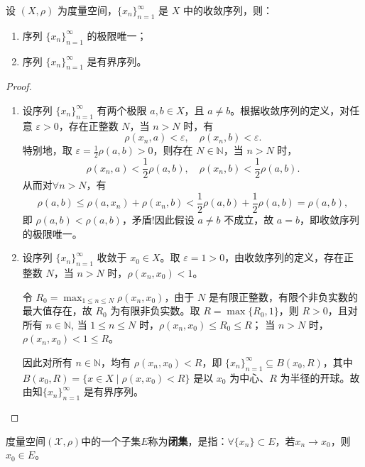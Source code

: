 \documentclass[../../main.tex]{subfiles}%
\begin{document}
\begin{theorem}\label{theorem:度量空间中收敛序列极限的唯一性和序列有界性}
设 $(X,\rho)$ 为度量空间，$\{x_n\}_{n=1}^\infty$ 是 $X$ 中的收敛序列，则：
\begin{enumerate}[(1)]
\item 序列 $\{x_n\}_{n=1}^\infty$ 的极限唯一；

\item 序列 $\{x_n\}_{n=1}^\infty$ 是有界序列。
\end{enumerate}
\end{theorem}
\begin{proof}
\begin{enumerate}[(1)]
\item 设序列 $\{x_n\}_{n=1}^\infty$ 有两个极限 $a,b \in X$，且 $a \neq b$。根据收敛序列的定义，对任意 $\varepsilon > 0$，存在正整数 $N$，当 $n > N$ 时，有
\[
\rho(x_n,a) < \varepsilon, \quad \rho(x_n,b) < \varepsilon.
\]
特别地，取 $\varepsilon = \frac{1}{2}\rho(a,b) > 0$，则存在 $N \in \mathbb{N}$，当 $n > N$ 时，
\[
\rho(x_n,a) < \frac{1}{2}\rho(a,b), \quad \rho(x_n,b) < \frac{1}{2}\rho(a,b).
\]
从而对$\forall n > N$，有
\[
\rho(a,b) \leqslant \rho(a,x_n) + \rho(x_n,b) < \frac{1}{2}\rho(a,b) + \frac{1}{2}\rho(a,b) = \rho(a,b),
\]
即 $\rho(a,b) < \rho(a,b)$，矛盾!因此假设 $a \neq b$ 不成立，故 $a = b$，即收敛序列的极限唯一。

\item 设序列 $\{x_n\}_{n=1}^\infty$ 收敛于 $x_0 \in X$。取 $\varepsilon = 1 > 0$，由收敛序列的定义，存在正整数 $N$，当 $n > N$ 时，$\rho(x_n,x_0) < 1$。

令 $R_0 = \max_{1 \leqslant n \leqslant N} \rho(x_n,x_0)$，由于 $N$ 是有限正整数，有限个非负实数的最大值存在，故 $R_0$ 为有限非负实数。取 $R = \max\{R_0, 1\}$，则 $R > 0$，且对所有 $n \in \mathbb{N}$,
当 $1 \leqslant n \leqslant N$ 时，$\rho(x_n,x_0) \leqslant R_0 \leqslant R$；
当 $n > N$ 时，$\rho(x_n,x_0) < 1 \leqslant R$。

因此对所有 $n \in \mathbb{N}$，均有 $\rho(x_n,x_0) < R$，即 $\{x_n\}_{n=1}^\infty \subseteq B(x_0, R)$，其中 $B(x_0,R) = \{x \in X \mid \rho(x,x_0) < R\}$ 是以 $x_0$ 为中心、$R$ 为半径的开球。故由知$\{x_n\}_{n=1}^\infty$ 是有界序列。
\end{enumerate}
\end{proof}

\begin{definition}
度量空间$(\mathscr{X},\rho)$中的一个子集$E$称为\textbf{闭集}，是指：$\forall \{x_n\} \subset E$，若$x_n \to x_0$，则$x_0 \in E$。
\end{definition}
\end{document}
